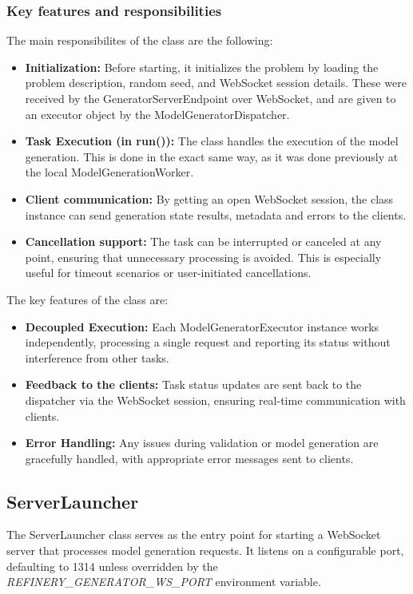 		\subsubsection{Key features and responsibilities}\label{Key features and responsibilites}
			The main responsibilites of the class are the following:
			\begin{itemize}
				\item \textbf{Initialization:} Before starting, it initializes the problem by loading the problem description, random seed, and WebSocket session details. These were
				received by the GeneratorServerEndpoint over WebSocket, and are given to an executor object by the ModelGeneratorDispatcher.
				\item \textbf{Task Execution (in run()):} The class handles the execution of the model generation. This is done in the exact same way, as it was done previously at the local ModelGenerationWorker.
				\item \textbf{Client communication:} By getting an open WebSocket session, the class instance can send generation state results, metadata and errors to the clients.
				\item \textbf{Cancellation support:} The task can be interrupted or canceled at any point, ensuring that unnecessary processing is avoided. This is especially useful for timeout scenarios or user-initiated cancellations.
			\end{itemize}
			The key features of the class are:
			\begin{itemize}
				\item \textbf{Decoupled Execution:} Each ModelGeneratorExecutor instance works independently, processing a single request and reporting its status without interference from other tasks.
				\item \textbf{Feedback to the clients:} Task status updates are sent back to the dispatcher via the WebSocket session, ensuring real-time communication with clients.
				\item \textbf{Error Handling:} Any issues during validation or model generation are gracefully handled, with appropriate error messages sent to clients.
			\end{itemize}

		\subsection{ServerLauncher}\label{Serverlauncher}
		The ServerLauncher class serves as the entry point for starting a WebSocket server that 
		processes model generation requests. It listens on a configurable port, defaulting to 1314 
		unless overridden by the \textit{REFINERY\_GENERATOR\_WS\_PORT} environment variable. 
		
